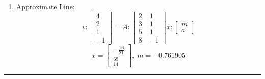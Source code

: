 \documentclass[11pt]{article}
\begin{document}
\begin{preview}
\begin{enumerate}
            \item Approximate Line:
            $$v:\begin{bmatrix}
                  4\\2\\1\\-1
            \end{bmatrix}=A:\begin{bmatrix}
                  2\;&1\\3\;&1\\5\;&1\\8\;&-1
            \end{bmatrix}x:\begin{bmatrix}
                  m\\a
            \end{bmatrix}$$
            $$x=\begin{bmatrix}
                  -\frac{16}{21} \\ \frac{69}{14}
            \end{bmatrix}, \; m = -0.761905$$
      \end{enumerate}
      \hrule
\end{preview}
\end{document}
